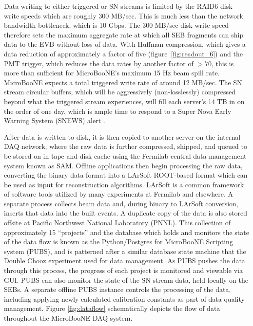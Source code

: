 Data writing to either triggered or SN streams is limited by the RAID6 disk write speeds which are roughly 300 MB/sec. This is much less than the network bandwidth bottleneck, which is 10 Gbps. The 300 MB/sec disk write speed therefore sets the maximum aggregate rate at which all SEB fragments can ship data to the EVB without loss of data. With Huffman compression, which gives a data reduction of approximately a factor of five (figure~\ref{fig:readout_6}) and the PMT trigger, which reduces the data rates by another factor of $>70$, this is more than sufficient for MicroBooNE's maximum 15 Hz beam spill rate. MicroBooNE expects a total triggered write rate of around 12 MB/sec. The SN stream circular buffers, which will be aggressively (non-losslessly) compressed beyond what the triggered stream experiences, will fill each server's 14 TB in on the order of one day, which is ample time to respond to a Super Nova Early Warning System (SNEWS) alert \cite{Scholberg:2008fa}.

After data is written to disk, it is then copied to another server on the internal DAQ network, where the raw data is further compressed, shipped, and queued to be stored on in tape and disk cache using the Fermilab central data management system known as SAM.  Offline applications then begin processing the raw data, converting the binary data format into a LArSoft \cite{larsoft} ROOT-based format which can be used as input for reconstruction algorithms.  LArSoft is a common framework of software tools utilized by many \lartpc experiments at Fermilab and elsewhere.  A separate process collects beam data and, during binary to LArSoft conversion, inserts that data into the built events. A duplicate copy of the data is also stored offsite at Pacific Northwest National Laboratory (PNNL). This collection of approximately 15 ``projects''  and the database which holds and monitors the state of the data flow is known as the Python/Postgres for MicroBooNE Scripting system (PUBS), and is patterned after a similar database state machine that the Double Chooz experiment used for data management.  As PUBS pushes the data through this process, the progress of each project is monitored and viewable via GUI. PUBS can also monitor the state of the SN stream data, held locally on the SEBs.  A separate offline PUBS instance controls the processing of the data, including applying newly calculated calibration constants as part of data quality management.  Figure \ref{fig:dataflow} schematically depicts the flow of data throughout the MicroBooNE DAQ system.

